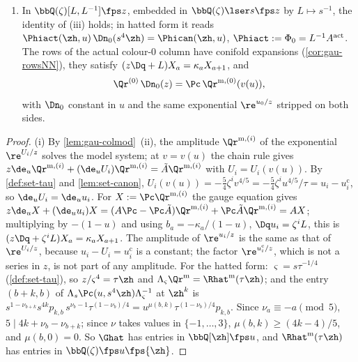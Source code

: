 \begin{thm}
\begin{enumerate}
\item In $\bbQ(\zeta)[L,L^{-1}]\fps z$, embedded in $\bbQ(\zeta)\lser s\fps z$ by $L\mapsto s^{-1}$, the identity of (iii) holds; in hatted form it reads $\Phiact(\zh,u)\,\Dn_0(s^4\zh)=\Phican(\zh,u)$, $\Phiact:=\Phi_0=L^{-1}A^{\mathrm{act}}$. The rows of the actual colour-$0$ column have conifold expansions (\cref{cor:gau-rowsNN}), they satisfy $(z\Dq+L)X_a=\kappa_aX_{a+1}$, and
\begin{equation}
\label{eq:gau-R0zero}
\Qr^{(0)}\,\Dn_0(z)=\Pc\,\Qr^{\mathrm m,(0)}(v(u)),
\end{equation}
with $\Dn_0$ constant in $u$ and the same exponential $\re^{u_0/z}$ stripped on both sides.
\end{enumerate}
\end{thm}

\begin{proof}
(i) By \cref{lem:gau-colmod}~(ii), the amplitude $\Qr^{\mathrm m,(i)}$ of the exponential $\re^{U_i/z}$ solves the model system; at $v=v(u)$ the chain rule gives $z\de_u\Qr^{\mathrm m,(i)}+(\de_uU_i)\Qr^{\mathrm m,(i)}=\tilde A\Qr^{\mathrm m,(i)}$ with $U_i=U_i(v(u))$. By \cref{def:set-tau} and \cref{lem:set-canon}, $U_i(v(u))=-\frac54\zeta^iv^{4/5}=-\frac54\zeta^iu^{4/5}/\tau=u_i-u_i^{\mathrm c}$, so $\de_uU_i=\de_uu_i$. For $X:=\Pc\Qr^{\mathrm m,(i)}$ the gauge equation gives $z\de_uX+(\de_uu_i)X=(A\Pc-\Pc\tilde A)\Qr^{\mathrm m,(i)}+\Pc\tilde A\Qr^{\mathrm m,(i)}=AX$; multiplying by $-(1-u)$ and using $b_a=-\kappa_a/(1-u)$, $\Dq u_i=\zeta^iL$, this is $(z\Dq+\zeta^iL)X_a=\kappa_aX_{a+1}$. The amplitude of $\re^{u_i/z}$ is the same as that of $\re^{U_i/z}$, because $u_i-U_i=u_i^{\mathrm c}$ is a constant; the factor $\re^{u_i^{\mathrm c}/z}$, which is not a series in $z$, is not part of any amplitude. For the hatted form: $\varsigma=s\tau^{-1/4}$ (\cref{def:set-tau}), so $z/\varsigma^4=\tau\zh$ and $\Lambda_\varsigma\Qr^{\mathrm m}=\Rhat^{\mathrm m}(\tau\zh)$; and the entry $(b+k,b)$ of $\Lambda_s\Pc(u,s^4\zh)\Lambda_\varsigma^{-1}$ at $\zh^k$ is $s^{1-\nu_{b+k}}s^{4k}p_{k,b}\,s^{\nu_b-1}\tau^{(1-\nu_b)/4}=u^{\mu(b,k)}\tau^{(1-\nu_b)/4}p_{k,b}$. Since $\nu_a\equiv-a\pmod5$, $5\mid4k+\nu_b-\nu_{b+k}$; since $\nu$ takes values in $\{-1,\dots,3\}$, $\mu(b,k)\geq(4k-4)/5$, and $\mu(b,0)=0$. So $\Ghat$ has entries in $\bbQ[\zh]\fps u$, and $\Rhat^{\mathrm m}(\tau\zh)$ has entries in $\bbQ(\zeta)\fps u\fps{\zh}$.


\end{proof}
